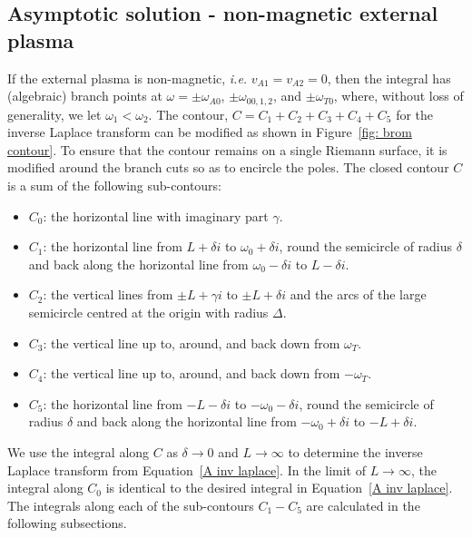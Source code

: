 \documentclass[12pt]{article}
\begin{document}
\subsection{Asymptotic solution - non-magnetic external plasma}
If the external plasma is non-magnetic, \textit{i.e.} $v_{A1} = v_{A2} = 0$, then the integral has (algebraic) branch points at $\omega = \pm \omega_{A0}$, $\pm \omega_{00,1,2}$, and $\pm \omega_{T0}$, where, without loss of generality, we let $\omega_1 < \omega_2$. The contour, $C = C_1 + C_2 + C_3 + C_4 + C_5$ for the inverse Laplace transform can be modified as shown in Figure~\ref{fig: brom contour}. To ensure that the contour remains on a single Riemann surface, it is modified around the branch cuts so as to encircle the poles. The closed contour $C$ is a sum of the following sub-contours:
\begin{itemize}
	\item $C_0$: the horizontal line with imaginary part $\gamma$.
	\item $C_1$: the horizontal line from $L + \delta i$ to $\omega_0 + \delta i$, round the semicircle of radius $\delta$ and back along the horizontal line from $\omega_0 - \delta i$ to $L - \delta i$.
	\item $C_2$: the vertical lines from $\pm L + \gamma i$ to $\pm L + \delta i$ and the arcs of the large semicircle centred at the origin with radius $\Delta$.
	\item $C_3$: the vertical line up to, around, and back down from $\omega_T$.
	\item $C_4$: the vertical line up to, around, and back down from $-\omega_T$.
	\item $C_5$: the horizontal line from $-L - \delta i$ to $-\omega_0 - \delta i$, round the semicircle of radius $\delta$ and back along the horizontal line from $-\omega_0 + \delta i$ to $-L + \delta i$.
\end{itemize}
We use the integral along $C$ as $\delta \to 0$ and $L \to \infty$ to determine the inverse Laplace transform from Equation~\eqref{A inv laplace}. In the limit of $L \to \infty$, the integral along $C_0$ is identical to the desired integral in Equation~\eqref{A inv laplace}. The integrals along each of the sub-contours $C_1 - C_5$ are calculated in the following subsections.
\end{document}
